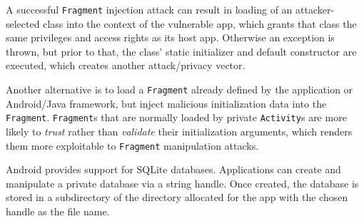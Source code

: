 A successful {\tt Fragment} injection attack can result in loading of an attacker-selected class into the context of the vulnerable app, which grants that class the same privileges and access rights as its host app.
Otherwise an exception is thrown, but prior to that, the class' static initializer and default constructor are executed, which creates another attack/privacy vector.

Another alternative is to load a {\tt Fragment} already defined by the application or Android/Java framework, but inject malicious initialization data into the {\tt Fragment}. {\tt Fragment}s that are normally loaded by private {\tt Activity}s are more likely to \emph{trust} rather than \emph{validate} their initialization arguments, which renders them more exploitable to {\tt Fragment} manipulation attacks.
%


%




 Android provides support for SQLite databases. Applications can create
and manipulate a private database via a string handle. Once created, the database
is stored in a subdirectory of the directory allocated for the app
with the chosen handle as the file name. 

